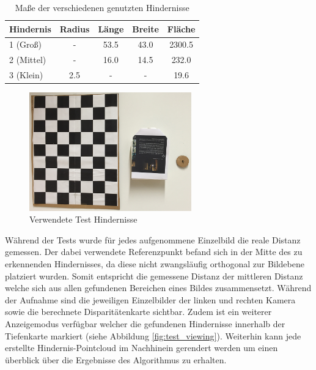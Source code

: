 \begin{table}[h]
\centering
\begin{tabular}{|l|c|c|c|c|}
\hline
Hindernis   & Radius & Länge & Breite & Fläche \\
\hline
1 (Groß)   	&   -    & 53.5  & 43.0   & 2300.5 \\
\hline
2 (Mittel) 	& 	-    & 16.0  & 14.5   & 232.0\\
\hline
3 (Klein)	&  2.5	 &   -   &   -    & 19.6 \\
\hline	
\end{tabular}
\caption{Maße der verschiedenen genutzten Hindernisse}
\label{tbl:obstacle_sizes}
\end{table}

\begin{figure}[h]
	\centering
	\includegraphics[width=7cm]{img/test_obstacles}
	\caption{Verwendete Test Hindernisse}
	\label{fig:test_obstacles}
\end{figure}


\noindent
Während der Tests wurde für jedes aufgenommene Einzelbild die reale Distanz gemessen. Der dabei verwendete Referenzpunkt befand sich in der Mitte des zu erkennenden Hindernisses, da diese nicht zwangsläufig orthogonal zur Bildebene platziert wurden. Somit entspricht die gemessene Distanz der mittleren Distanz welche sich aus allen gefundenen Bereichen eines Bildes zusammensetzt. Während der Aufnahme sind die jeweiligen Einzelbilder der linken und rechten Kamera sowie die berechnete Disparitätenkarte sichtbar. Zudem ist ein weiterer Anzeigemodus verfügbar welcher die gefundenen Hindernisse innerhalb der Tiefenkarte markiert (siehe Abbildung \ref{fig:test_viewing}). Weiterhin kann jede erstellte Hindernis-Pointcloud im Nachhinein gerendert werden um einen überblick über die Ergebnisse des Algorithmus zu erhalten.\\

